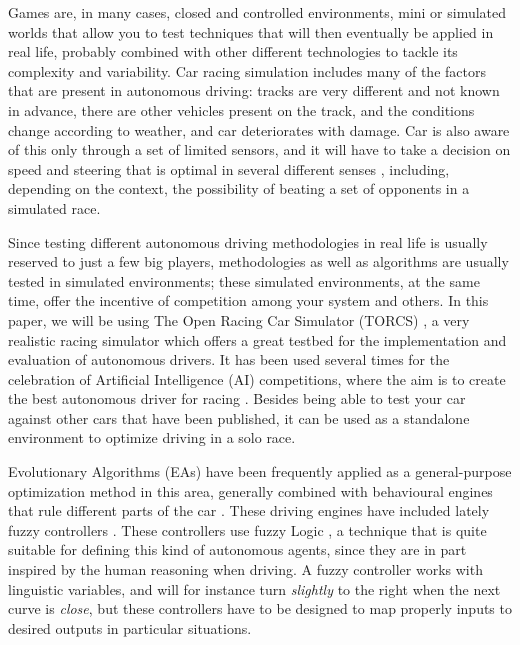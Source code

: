 \documentclass[conference]{IEEEtran}
\begin{document}
Games are, in many cases, closed and controlled environments, mini or
simulated worlds that allow you to test techniques that will then
eventually be applied in real life, probably combined with other
different technologies to tackle its complexity and variability. Car
racing simulation includes many of the factors that are present in
autonomous driving: tracks are very different and not known in
advance, there are other vehicles present on the track, and the
conditions change according to weather, and car deteriorates with
damage. Car is also aware of this only through a set of limited
sensors, and it will have to take a decision on speed and steering that is optimal in several different senses \cite{Autodriv2006}, including, depending on the context, the possibility of beating a set of opponents in a simulated race.


Since testing different autonomous driving methodologies in real life is
usually reserved to just a few big players, methodologies 
as well as algorithms are usually tested in simulated environments;
these simulated environments, at the same time, offer the incentive of
competition among your system and others. In this paper, we will be
using The Open Racing Car Simulator (TORCS) \cite{torcs4}, a very
realistic racing simulator which offers a great testbed for the
implementation and evaluation of autonomous drivers.  
It has been used several times for the celebration of Artificial
Intelligence (AI) competitions, where the aim is to create the best
autonomous driver for racing
\cite{SimulatedCarRacing-2008,SimulatedCarRacing-2010,manualTORCS}. Besides being able to test your car against other cars that have been published, it can be used as a standalone environment to optimize driving in a
solo race. 

Evolutionary Algorithms (EAs) \cite{EAs_Back96} have been frequently
applied as a general-purpose optimization method in this area,
generally combined with behavioural engines that rule different parts
of the car
\cite{CarRacing_Pelta09,SAES2012,Autopia2012}. These
driving engines have included lately fuzzy controllers
\cite{Guadarrama2008, LFAG, PerezEvolvingFuzzy09}. These controllers
use fuzzy Logic \cite{Fuzzy2011}, a  technique that is quite suitable
for defining this kind of autonomous agents, since they are in part
inspired by the human reasoning when driving. A fuzzy controller works
with linguistic variables, and will for instance turn {\em slightly}
to the right when the next curve is {\em close}, but these controllers
have to be designed to map properly inputs to desired outputs in
particular situations. 
\end{document}
